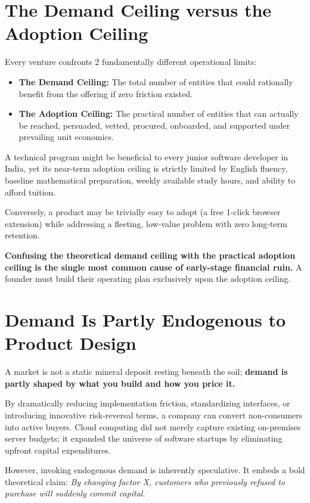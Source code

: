 \section{The Demand Ceiling versus the Adoption Ceiling}

Every venture confronts 2 fundamentally different operational limits:
\begin{itemize}[leftmargin=12pt,itemsep=1pt,topsep=1pt]
  \item \textbf{The Demand Ceiling:} The total number of entities that could rationally benefit from the offering if zero friction existed.
  \item \textbf{The Adoption Ceiling:} The practical number of entities that can actually be reached, persuaded, vetted, procured, onboarded, and supported under prevailing unit economics.
\end{itemize}

A technical program might be beneficial to every junior software developer in India, yet its near-term adoption ceiling is strictly limited by English fluency, baseline mathematical preparation, weekly available study hours, and ability to afford tuition.

Conversely, a product may be trivially easy to adopt (a free 1-click browser extension) while addressing a fleeting, low-value problem with zero long-term retention.

\textbf{Confusing the theoretical demand ceiling with the practical adoption ceiling is the single most common cause of early-stage financial ruin.} A founder must build their operating plan exclusively upon the adoption ceiling.

\section{Demand Is Partly Endogenous to Product Design}

A market is not a static mineral deposit resting beneath the soil; \textbf{demand is partly shaped by what you build and how you price it.}

By dramatically reducing implementation friction, standardizing interfaces, or introducing innovative risk-reversal terms, a company can convert non-consumers into active buyers. Cloud computing did not merely capture existing on-premises server budgets; it expanded the universe of software startups by eliminating upfront capital expenditures.

However, invoking endogenous demand is inherently speculative. It embeds a bold theoretical claim: \textit{By changing factor X, customers who previously refused to purchase will suddenly commit capital.}

